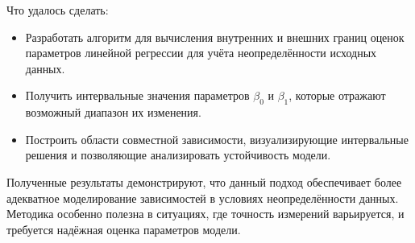 \documentclass{article}
\begin{document}
    Что удалось сделать:
    
    \begin{itemize}  
      \item Разработать алгоритм для вычисления внутренних и внешних границ  
        оценок параметров линейной регрессии для учёта  
        неопределённости исходных данных.  
      \item Получить интервальные значения параметров \( \beta_0 \) и  
        \( \beta_1 \), которые отражают возможный диапазон их изменения.  
      \item Построить области совместной зависимости, визуализирующие  
        интервальные решения и позволяющие анализировать устойчивость модели.  
    \end{itemize}  
    
    Полученные результаты демонстрируют, что данный подход обеспечивает более  
    адекватное моделирование зависимостей в условиях неопределённости данных.  
    Методика особенно полезна в ситуациях, где точность измерений  
    варьируется, и требуется надёжная оценка параметров модели.  
  
\end{document}
